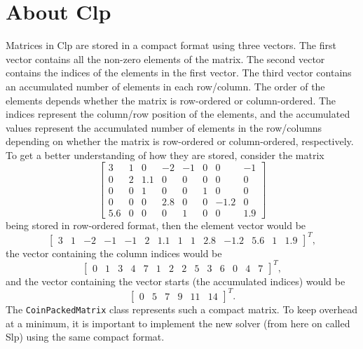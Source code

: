 \section{About Clp}
Matrices in Clp are stored in a compact format using three vectors.
The first vector contains all the non-zero elements of the matrix.
The second vector contains the indices of the elements in the first vector.
The third vector contains an accumulated number of elements in each row/column.
The order of the elements depends whether the matrix is row-ordered or
column-ordered.
The indices represent the column/row position of the elements, and the
accumulated values represent the accumulated number of elements in the
row/columns depending on whether the matrix is row-ordered or column-ordered,
respectively.
To get a better understanding of how they are stored, consider the matrix
\[
\left[
\begin{array}{rrrrrrrr}
    3 & 1 & 0   & -2  & -1 & 0 & 0    & -1 \\
    0 & 2 & 1.1 & 0   & 0  & 0 & 0    & 0  \\
    0 & 0 & 1   & 0   & 0  & 1 & 0    & 0  \\
    0 & 0 & 0   & 2.8 & 0  & 0 & -1.2 & 0  \\
  5.6 & 0 & 0   & 0   & 1  & 0 & 0    & 1.9  

\end{array}
\right]
\]
being stored in row-ordered format, then the element vector would be
\[
\left[
\begin{array}{rrrrrrrrrrrrrr}
    3 & 1 & -2 & -1 & -1 & 2 & 1.1 & 1 & 1 & 2.8 & -1.2 & 5.6 & 1 & 1.9
\end{array}
\right]^T,
\]
the vector containing the column indices would be
\[
\left[
\begin{array}{rrrrrrrrrrrrrr}
    0 & 1 & 3 & 4 & 7 & 1 & 2 & 2 & 5 & 3 & 6 & 0 & 4 & 7
\end{array}
\right]^T,
\]
and the vector containing the vector starts (the accumulated indices) would be
\[
\left[
\begin{array}{rrrrrr}
    0 & 5 & 7 & 9 & 11 & 14
\end{array}
\right]^T.
\]
The \texttt{CoinPackedMatrix} class represents such a compact matrix.
To keep overhead at a minimum, it is important to implement the new solver
(from here on called Slp) using the same compact format.

